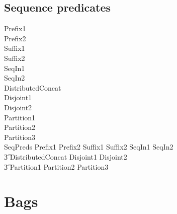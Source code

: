 \documentclass{article}
\begin{document}
\subsection{Sequence predicates}
\begin{zed}
  Prefix1 \\
  Prefix2 \\
  Suffix1 \\
  Suffix2 \\
  SeqIn1 \\
  SeqIn2 \\
  DistributedConcat \\
  Disjoint1 \\
  Disjoint2 \\
  Partition1 \\
  Partition2 \\
  Partition3 \\
  \also
  SeqPreds  Prefix1 \land Prefix2 \land Suffix1 \land Suffix2 \land SeqIn1 \land SeqIn2 \land \\
  \t3 DistributedConcat \land Disjoint1 \land Disjoint2 \land \\
  \t3 Partition1 \land Partition2 \land Partition3 \\
\end{zed}

\section{Bags}
\end{document}
